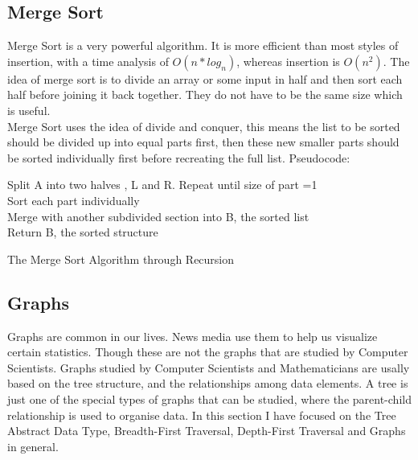 \documentclass[10pt,twocolumn]{IEEEtran}
\begin{document}
\subsection{Merge Sort}
Merge Sort is a very powerful algorithm. It is more efficient than most styles of insertion, with a time analysis of $O(n * log_{n})$, whereas insertion is $O(n^2)$. The idea of merge sort is to divide an array or some input in half and then sort each half before joining it back together. They do not have to be the same size which is useful.  \\
Merge Sort uses the idea of divide and conquer, this means the list to be sorted should be divided up into equal parts first, then these new smaller parts should be sorted individually first before recreating the full list.
Pseudocode:
\IncMargin{1em}
\begin{algorithm}
	\SetAlgoLined
  	{Split A into two halves , L and R. Repeat until size of part =1\\
  	Sort each part individually \\
  	Merge with another subdivided section into B, the sorted list\\ 
  	Return B, the sorted structure}
\caption{The Merge Sort Algorithm through Recursion}
\end{algorithm}\DecMargin{1em}

\subsection{Graphs}
Graphs are common in our lives. News media use them to help us visualize certain statistics. Though these are not the graphs that are studied by Computer Scientists. Graphs studied by Computer Scientists and Mathematicians are usally based on the tree structure, and the relationships among data elements. A tree is just one of the special types of graphs that can be studied, where the parent-child relationship is used to organise data. In this section I have focused on the Tree Abstract Data Type, Breadth-First Traversal, Depth-First Traversal and Graphs in general.  \\
\end{document}
